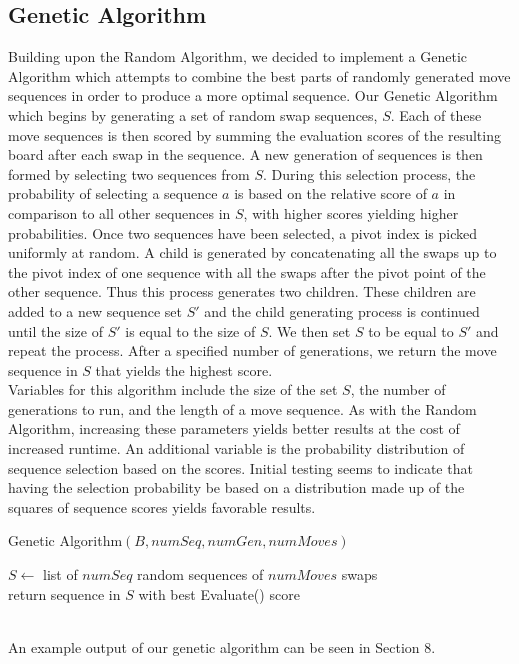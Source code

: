 \documentclass[10pt, final]{article}
\newcommand{\br}[1][.75]{\ \\[#1\baselineskip]}
\begin{document}
\subsection{Genetic Algorithm}
Building upon the Random Algorithm, we decided to implement a Genetic Algorithm which attempts to combine the best parts of randomly generated move sequences in order to produce a more optimal sequence. Our Genetic Algorithm which begins by generating a set of random swap sequences, $S$. Each of these move sequences is then scored by summing the evaluation scores of the resulting board after each swap in the sequence. A new generation of sequences is then formed by selecting two sequences from $S$. During this selection process, the probability of selecting a sequence $a$ is based on the relative score of $a$ in comparison to all other sequences in $S$, with higher scores yielding higher probabilities. Once two sequences have been selected, a pivot index is picked uniformly at random. A child is generated by concatenating all the swaps up to the pivot index of one sequence with all the swaps after the pivot point of the other sequence. Thus this process generates two children. These children are added to a new sequence set $S'$ and the child generating process is continued until the size of $S'$ is equal to the size of $S$. We then set $S$ to be equal to $S'$ and repeat the process. After a specified number of generations, we return the move sequence in $S$ that yields the highest score. \br
Variables for this algorithm include the size of the set $S$, the number of generations to run, and the length of a move sequence. As with the Random Algorithm, increasing these parameters yields better results at the cost of increased runtime. An additional variable is the probability distribution of sequence selection based on the scores. Initial testing seems to indicate that having the selection probability be based on a distribution made up of the squares of sequence scores yields favorable results.
\begin{algorithm}\label{genetic}\small
\caption{\small Genetic Algorithm$(B, numSeq, numGen, numMoves)$}
$S \gets$ list of $numSeq$ random sequences of $numMoves$ swaps\\
return sequence in $S$ with best Evaluate() score\\
\end{algorithm}\\
An example output of our genetic algorithm can be seen in Section $8$.
\end{document}
